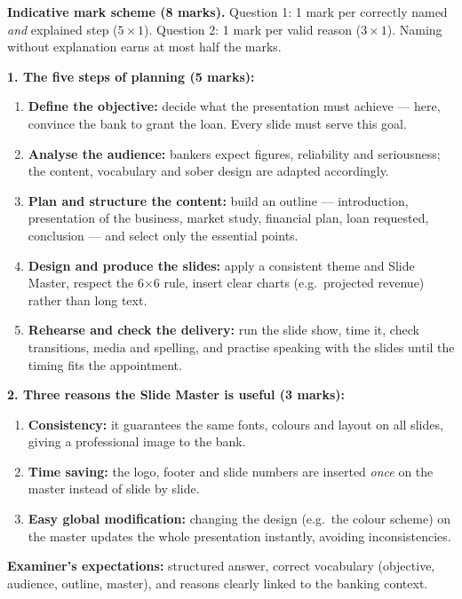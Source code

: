 \documentclass[11pt]{article}
\begin{document}
\begin{corrige}
\textbf{Indicative mark scheme (8 marks).} Question 1: 1 mark per correctly named \emph{and} explained step ($5 \times 1$). Question 2: 1 mark per valid reason ($3 \times 1$). Naming without explanation earns at most half the marks.

\textbf{1. The five steps of planning (5 marks):}
\begin{enumerate}
\item \textbf{Define the objective:} decide what the presentation must achieve — here, convince the bank to grant the loan. Every slide must serve this goal.
\item \textbf{Analyse the audience:} bankers expect figures, reliability and seriousness; the content, vocabulary and sober design are adapted accordingly.
\item \textbf{Plan and structure the content:} build an outline — introduction, presentation of the business, market study, financial plan, loan requested, conclusion — and select only the essential points.
\item \textbf{Design and produce the slides:} apply a consistent theme and Slide Master, respect the 6$\times$6 rule, insert clear charts (e.g.\ projected revenue) rather than long text.
\item \textbf{Rehearse and check the delivery:} run the slide show, time it, check transitions, media and spelling, and practise speaking with the slides until the timing fits the appointment.
\end{enumerate}

\textbf{2. Three reasons the Slide Master is useful (3 marks):}
\begin{enumerate}
\item \textbf{Consistency:} it guarantees the same fonts, colours and layout on all slides, giving a professional image to the bank.
\item \textbf{Time saving:} the logo, footer and slide numbers are inserted \emph{once} on the master instead of slide by slide.
\item \textbf{Easy global modification:} changing the design (e.g.\ the colour scheme) on the master updates the whole presentation instantly, avoiding inconsistencies.
\end{enumerate}
\textbf{Examiner's expectations:} structured answer, correct vocabulary (objective, audience, outline, master), and reasons clearly linked to the banking context.
\end{corrige}
\end{document}
